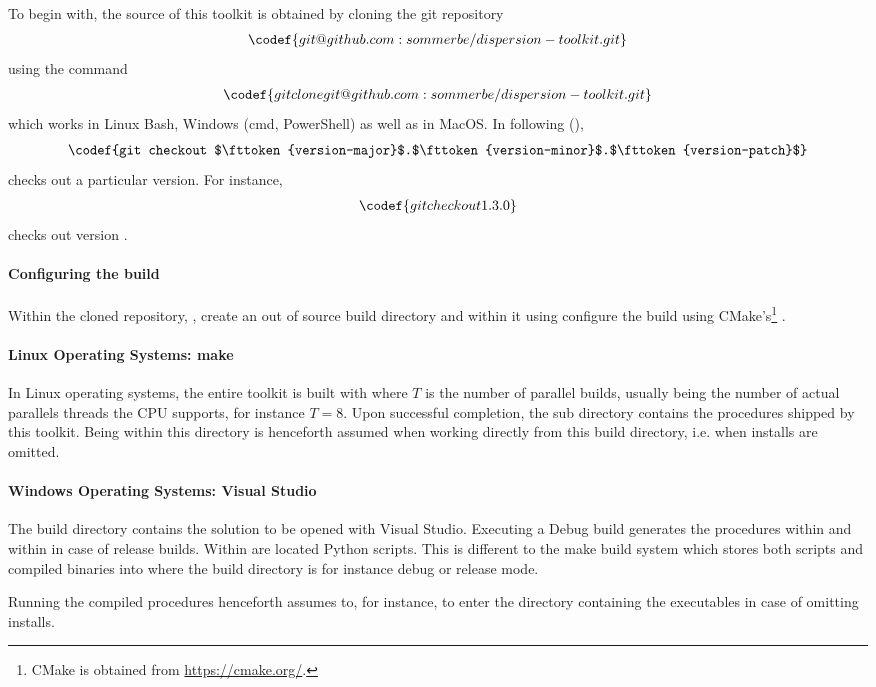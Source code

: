 To begin with, the source of this toolkit is obtained by cloning the git repository
\begin{align*}
  \codef{git@github.com:sommerbe/dispersion-toolkit.git}
\end{align*}
using the command
\begin{align*}
  \codef{git clone git@github.com:sommerbe/dispersion-toolkit.git}
\end{align*}
which works in Linux Bash, Windows (cmd, PowerShell) as well as in MacOS. In following (),
\begin{align*}
  \codef{git checkout $\fttoken{version-major}$.$\fttoken{version-minor}$.$\fttoken{version-patch}$}
\end{align*}
checks out a particular version. For instance,
\begin{align*}
  \codef{git checkout 1.3.0}
\end{align*}
checks out version .

\paragraph{Configuring the build}

Within the cloned repository,
,
create an out of source build directory
and within it using
configure the build using CMake's\footnote{CMake is obtained from \href{https://cmake.org/}{https://cmake.org/}.}
.


\paragraph{Linux Operating Systems: make}

In Linux operating systems, the entire toolkit is built with
where $T$ is the number of parallel builds, usually being the number of actual parallels threads the CPU supports, for instance $T=8$. Upon successful completion, the sub directory
contains the procedures shipped by this toolkit. Being within this directory is henceforth assumed when working directly from this build directory, i.e. when installs are omitted.


\paragraph{Windows Operating Systems: Visual Studio}

The build directory contains the solution
to be opened with Visual Studio. Executing a Debug build generates the procedures within
and within
in case of release builds. Within
are located Python scripts. This is different to the make build system which stores both scripts and compiled binaries into  where the build directory  is for instance debug or release mode.

Running the compiled procedures henceforth assumes to, for instance,
to enter the directory containing the executables in case of omitting installs.


